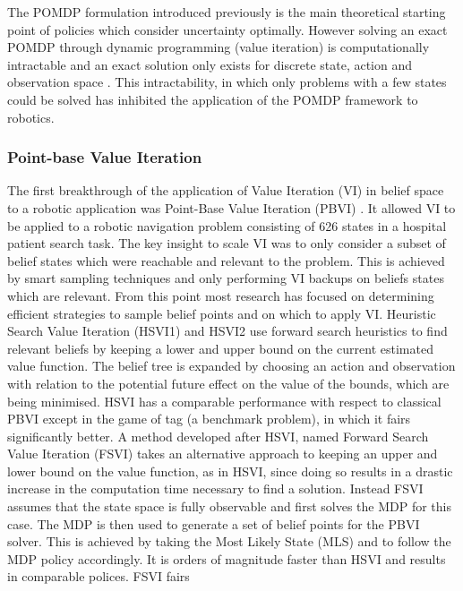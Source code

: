 The POMDP formulation introduced previously is the main theoretical starting point of policies which
consider uncertainty optimally. However solving an exact POMDP through dynamic programming (value iteration) is 
computationally intractable and an exact solution only exists for discrete state, action and observation space \cite[Chap. 15]{Thrun_2005}. 
This intractability, in which only problems with a few states could be solved has inhibited the application of the POMDP framework to robotics. 

\subsubsection{Point-base Value Iteration}

The first breakthrough of the application of Value Iteration (VI) in belief space to a robotic application was Point-Base Value Iteration (PBVI) \citep{PBVI}. 
It allowed VI to be applied to a robotic navigation problem consisting of 626 states in a hospital patient search task. The key insight to scale VI was to only 
consider a subset of belief states which were reachable and relevant to the problem. This is achieved by smart sampling techniques and only performing VI 
backups on beliefs states which are relevant. From this point most research has focused on determining efficient strategies to sample belief points and on which to apply VI. 
Heuristic Search Value Iteration (HSVI1) \citep{HSV} and HSVI2 \citep{HSVI2} use forward search heuristics to find relevant beliefs by keeping a lower and upper bound on the current estimated value function. The belief tree 
is expanded by choosing an action and observation with relation to the potential future effect on the value of the bounds, which are being minimised. HSVI has a comparable performance with respect to classical PBVI except in the
game of tag (a benchmark problem), in which it fairs significantly better. 
A method developed after HSVI, named Forward Search Value Iteration (FSVI) \citep{FSVI} takes an alternative approach to keeping an upper and lower bound on the 
value function, as in HSVI, since doing so results in a drastic increase in the computation time necessary to find a solution. Instead FSVI assumes that the state 
space is fully observable and first solves the MDP for this case. The MDP is then used to generate a set of belief points for the PBVI solver. This is achieved by 
taking the Most Likely State (MLS) and to follow the MDP policy accordingly. It is orders of magnitude faster than HSVI and results in comparable polices. FSVI fairs 
